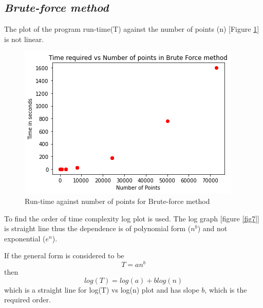 \documentclass[twocolumn,11pt]{article}
\begin{document}
\subsection{\textit{Brute-force method}}
The plot of the program run-time(T) against the number of points (n) [Figure \ref{fig5}] is not linear.
\begin{figure}
\centering
	\includegraphics[width=0.9\linewidth]{brute}
	\caption{\small{Run-time against number of points for Brute-force method}}
	\label{fig5}
\end{figure}
To find the order of time complexity log plot is used. The log graph [figure \ref{fig7}] is straight line thus the dependence is of polynomial form (\(n^b\)) and not exponential (\(e^n\)). 

If the general form is considered to be 
\begin{equation} T = an^b \end{equation} then 
\begin{equation} log(T) = log(a) + blog(n) \end{equation}
which is a straight line for log(T) vs log(n) plot and has slope \(b\), which is the required order.
\end{document}
